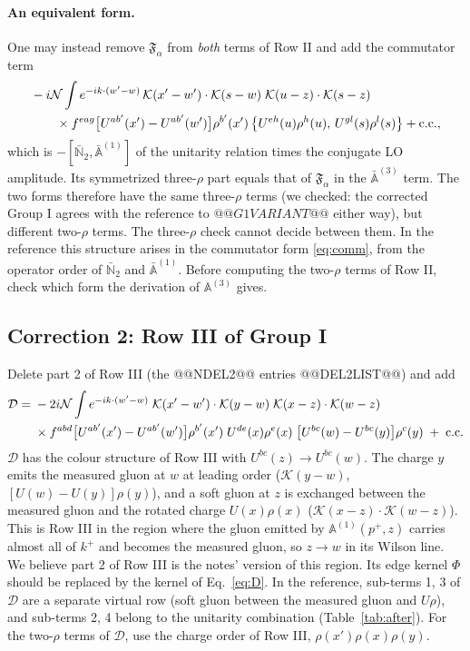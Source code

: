 \documentclass[10pt]{article}
\numberwithin{equation}{section}
\newcommand{\KK}{\mathcal K}
\newcommand{\NN}{\mathcal N}
\begin{document}
\paragraph{An equivalent form.} One may instead remove $\mathfrak F_\alpha$ from \emph{both} terms of Row II and add the commutator term
\begin{align}
&-i\NN\int e^{-ik\cdot(w'-w)}\,\KK(x'-w')\cdot\KK(s-w)\;\KK(u-z)\cdot\KK(s-z)\notag\\
&\qquad\times f^{eag}\big[U^{ab'}(x')-U^{ab'}(w')\big]\rho^{b'}(x')\,\big\{U^{eh}(u)\rho^h(u),\,U^{gl}(s)\rho^l(s)\big\}+{\rm c.c.},
\label{eq:comm}
\end{align}
which is $-[\bar{\mathbb N}_2,\bar{\mathbb A}^{(1)}]$ of the unitarity relation times the conjugate LO amplitude. Its symmetrized three-$\rho$ part equals that of $\mathfrak F_\alpha$ in the $\bar{\mathbb A}^{(3)}$ term. The two forms therefore have the same three-$\rho$ terms (we checked: the corrected Group I agrees with the reference to $@@G1VARIANT@@$ either way), but different two-$\rho$ terms. The three-$\rho$ check cannot decide between them. In the reference this structure arises in the commutator form \eqref{eq:comm}, from the operator order of $\bar{\mathbb N}_2$ and $\bar{\mathbb A}^{(1)}$. Before computing the two-$\rho$ terms of Row II, check which form the derivation of $\mathbb A^{(3)}$ gives.

\subsection{Correction 2: Row III of Group I}
Delete part 2 of Row III (the @@NDEL2@@ entries @@DEL2LIST@@) and add
\begin{align}
\mathcal D={}&-2i\NN\int e^{-ik\cdot(w'-w)}\;\KK(x'-w')\cdot\KK(y-w)\;\KK(x-z)\cdot\KK(w-z)\notag\\
&\times f^{abd}\big[U^{ab'}(x')-U^{ab'}(w')\big]\rho^{b'}(x')\;U^{de}(x)\rho^e(x)\;\big[U^{bc}(w)-U^{bc}(y)\big]\rho^c(y)\;+\;{\rm c.c.}
\label{eq:D}
\end{align}
$\mathcal D$ has the colour structure of Row III with $U^{bc}(z)\to U^{bc}(w)$. The charge $y$ emits the measured gluon at $w$ at leading order ($\KK(y-w)$, $[U(w)-U(y)]\rho(y)$), and a soft gluon at $z$ is exchanged between the measured gluon and the rotated charge $U(x)\rho(x)$ ($\KK(x-z)\cdot\KK(w-z)$). This is Row III in the region where the gluon emitted by $\mathbb A^{(1)}(p^+,z)$ carries almost all of $k^+$ and becomes the measured gluon, so $z\to w$ in its Wilson line. We believe part 2 of Row III is the notes' version of this region. Its edge kernel $\Phi$ should be replaced by the kernel of Eq.~\eqref{eq:D}. In the reference, sub-terms 1, 3 of $\mathcal D$ are a separate virtual row (soft gluon between the measured gluon and $U\rho$), and sub-terms 2, 4 belong to the unitarity combination (Table~\ref{tab:after}). For the two-$\rho$ terms of $\mathcal D$, use the charge order of Row III, $\rho(x')\rho(x)\rho(y)$.
\end{document}
